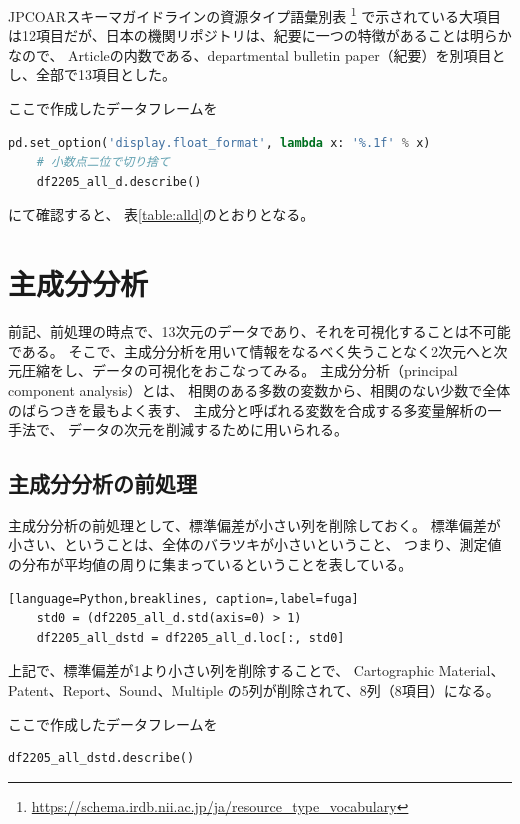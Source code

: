 \documentclass[submit,noauthor]{ono}
\begin{document}
JPCOARスキーマガイドラインの資源タイプ語彙別表
\footnote{\url{https://schema.irdb.nii.ac.jp/ja/resource_type_vocabulary}}
で示されている大項目は12項目だが、日本の機関リポジトリは、紀要に一つの特徴があることは明らかなので、
Articleの内数である、departmental bulletin paper（紀要）を別項目とし、全部で13項目とした。

ここで作成したデータフレームを

\begin{lstlisting}[language=Python,breaklines]
	pd.set_option('display.float_format', lambda x: '%.1f' % x)
	# 小数点二位で切り捨て
	df2205_all_d.describe()
\end{lstlisting}

にて確認すると、
表\ref{table:alld}のとおりとなる。

\section{主成分分析}
\label{PCA}
前記、前処理の時点で、13次元のデータであり、それを可視化することは不可能である。
そこで、主成分分析を用いて情報をなるべく失うことなく2次元へと次元圧縮をし、データの可視化をおこなってみる。
主成分分析（principal component analysis）とは、
相関のある多数の変数から、相関のない少数で全体のばらつきを最もよく表す、
主成分と呼ばれる変数を合成する多変量解析の一手法で、
データの次元を削減するために用いられる。

\subsection{主成分分析の前処理}
主成分分析の前処理として、標準偏差が小さい列を削除しておく。
標準偏差が小さい、ということは、全体のバラツキが小さいということ、
つまり、測定値の分布が平均値の周りに集まっているということを表している。

\begin{lstlisting}[language=Python,breaklines, caption=,label=fuga]
	std0 = (df2205_all_d.std(axis=0) > 1)
	df2205_all_dstd = df2205_all_d.loc[:, std0]
\end{lstlisting}

上記で、標準偏差が1より小さい列を削除することで、
Cartographic Material、Patent、Report、Sound、Multiple
の5列が削除されて、8列（8項目）になる。

ここで作成したデータフレームを

\begin{lstlisting}[language=Python,breaklines]
	df2205_all_dstd.describe()
\end{lstlisting}
\end{document}
